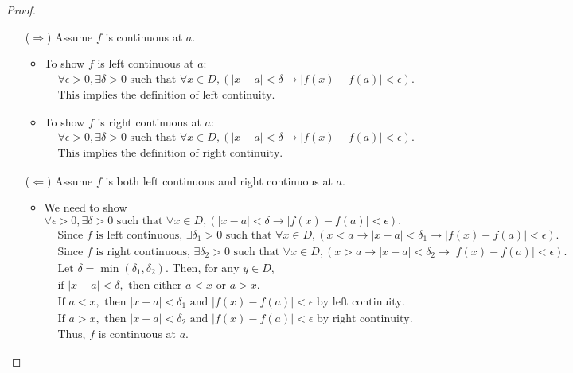 \begin{proof}
    \begin{itemize}
    \item[(\(\Rightarrow\))] Assume $f$ is continuous at $a$.
        \begin{itemize}
        \item To show $f$ is left continuous at $a$:
        \[
        \begin{aligned}
        &\forall \epsilon > 0, \exists \delta > 0 \text{ such that } \forall x \in D, (|x - a| < \delta \rightarrow |f(x) - f(a)| < \epsilon). \\
        & \text{This implies the definition of left continuity.}
        \end{aligned}
        \]

        \item To show $f$ is right continuous at $a$:
        \[
        \begin{aligned}
        &\forall \epsilon > 0, \exists \delta > 0 \text{ such that } \forall x \in D, (|x - a| < \delta \rightarrow |f(x) - f(a)| < \epsilon). \\
        & \text{This implies the definition of right continuity.}
        \end{aligned}
        \]
        \end{itemize}

    \item[(\(\Leftarrow\))] Assume $f$ is both left continuous and right continuous at $a$.
        \begin{itemize}
        \item We need to show $\forall \epsilon > 0, \exists \delta > 0 \text{ such that } \forall x \in D, (|x - a| < \delta \rightarrow |f(x) - f(a)| < \epsilon).$
        \[
        \begin{aligned}
        & \text{Since $f$ is left continuous, } \exists \delta_1 > 0 \text{ such that } \forall x \in D, (x < a \rightarrow |x - a| < \delta_1 \rightarrow |f(x) - f(a)| < \epsilon). \\
        & \text{Since $f$ is right continuous, } \exists \delta_2 > 0 \text{ such that } \forall x \in D, (x > a \rightarrow |x - a| < \delta_2 \rightarrow |f(x) - f(a)| < \epsilon). \\
        & \text{Let } \delta = \min(\delta_1, \delta_2). \text{ Then, for any } y \in D, \\
        & \text{if } |x - a| < \delta, \text{ then either } a < x \text{ or } a > x. \\
        & \text{If } a < x, \text{ then } |x - a| < \delta_1 \text{ and } |f(x) - f(a)| < \epsilon \text{ by left continuity.} \\
        & \text{If } a > x, \text{ then } |x - a| < \delta_2 \text{ and } |f(x) - f(a)| < \epsilon \text{ by right continuity.} \\
        & \text{Thus, } f \text{ is continuous at } a.
        \end{aligned}
        \]
        \end{itemize}
    \end{itemize}
\end{proof}
